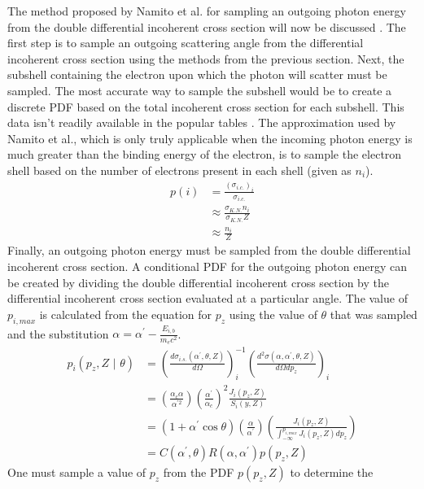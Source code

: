The method proposed by Namito et al. for sampling an outgoing photon energy
from the double differential incoherent cross section will now be discussed
\citep{namito_implementation_1994}. The first step is to sample an outgoing
scattering angle from the differential incoherent cross section using the 
methods from the previous section. Next, the subshell containing the electron 
upon which the photon will scatter must be sampled. The most accurate
way to sample the subshell would be to create a discrete PDF based on the total
incoherent cross section for each subshell. This data isn't readily available in
the popular tables \citep{cullen_epdl97_1997}. The approximation used by Namito 
et al., which is only truly applicable when the incoming photon energy is much 
greater than the binding energy of the electron, is to sample the electron shell
based on the number of electrons present in each shell (given as $n_i$).
\begin{align}
  p(i) & = \frac{(\sigma_{i.c.})_i}{\sigma_{i.c.}} \nonumber \\
  & \approx \frac{\sigma_{K.N.}n_i}{\sigma_{K.N.}Z} \nonumber \\
  & \approx \frac{n_i}{Z} 
\end{align}
Finally, an outgoing photon energy must be sampled from the double differential 
incoherent cross section. A conditional PDF for the outgoing photon energy can 
be created by dividing the double differential incoherent cross section by the 
differential incoherent cross section evaluated at a particular angle. The value
of $p_{i,max}$ is calculated from the equation for $p_z$ using the value of 
$\theta$ that was sampled and the substitution 
$\alpha = \alpha^{'}-\frac{E_{i,b}}{m_ec^2}$.
\begin{align}
  p_i(p_z,Z \text{ | } \theta) & = 
  \left(\frac{d\sigma_{i.s.}(\alpha^{'},\theta,Z)}{d\Omega} \right)_i^{-1}
  \left(\frac{d^2\sigma(\alpha,\alpha^{'},\theta,Z)}{d\Omega dp_z}\right)_i 
  \nonumber \\
  & = \left(\frac{\alpha_c\alpha}{\alpha^{'2}}\right)
  \left(\frac{\alpha^{'}}{\alpha_c}\right)^2
  \frac{J_i(p_z,Z)}{S_i(y,Z)} \nonumber \\
  & = (1 + \alpha^{'}\cos{\theta})\left(\frac{\alpha}{\alpha^{'}}\right)
  \left(\frac{J_i(p_z,Z)}{\int_{-\infty}^{p_{i,max}}J_i(p_z,Z)dp_z}\right) \nonumber\\
  & = C(\alpha^{'},\theta)R(\alpha,\alpha^{'})p(p_z,Z)
\end{align}
One must sample a value of $p_z$ from the PDF $p(p_z,Z)$ to determine the
